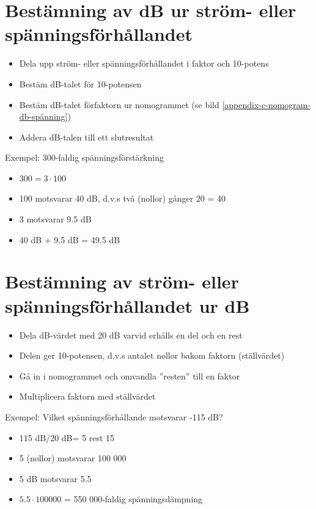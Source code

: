 \begin{rev-raderas}

\section{Bestämning av dB ur ström- eller spänningsförhållandet}

\begin{itemize}
\item Dela upp ström- eller spänningsförhållandet i faktor och 10-potens
\item Bestäm dB-talet för 10-potensen
\item Bestäm dB-talet förfaktorn ur nomogrammet (se bild \ref{appendix-c-nomogram-db-spänning})
\item Addera dB-talen till ett slutresultat
\end{itemize}

Exempel: 300-faldig spänningsförstärkning
\begin{itemize}
\item \(300 = 3 \cdot 100\)
\item 100 motsvarar 40 dB, d.v.s två (nollor) gånger 20 = 40
\item 3 motsvarar 9.5 dB
\item 40 dB + 9.5 dB = 49.5 dB
\end{itemize}

\section{Bestämning av ström- eller spänningsförhållandet ur dB}
\begin{itemize}
\item Dela dB-värdet med 20 dB varvid erhålls en del och en rest
\item Delen ger 10-potensen, d.v.s antalet nollor bakom faktorn
  (ställvärdet)
\item Gå in i nomogrammet och omvandla ''resten'' till en faktor
\item Multiplicera faktorn med ställvärdet
\end{itemize}

Exempel: Vilket spänningsförhållande motsvarar -115 dB?
\begin{itemize}
\item 115 dB/20 dB= 5 rest 15
\item 5 (nollor) motsvarar 100 000
\item 5 dB motsvarar 5.5
\item \(5.5 \cdot 1 00 000\) = 550 000-faldig spänningsdämpning
\end{itemize}

\end{rev-raderas}

